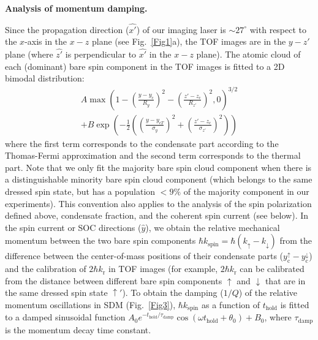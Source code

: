 \documentclass[showpacs,preprintnumbers,amsmath,amssymb, superscriptaddress, aps, reprint]{revtex4-1}
\def\k_r{k_{\text{r}}}
\def\thold{t_{\text{hold}}}
\begin{document}
{{{\vspace{5mm}

\textbf{Analysis of momentum damping.} 

Since the propagation direction ($\hat{x'}$) of our imaging laser is $\sim 27^{\circ}$ with respect to the $x$-axis in the $x-z$ plane (see Fig.~\ref{Fig1}a), the TOF images are in the $y-z'$ plane (where $\hat{z'}$ is perpendicular to $\hat{x'}$ in the $x-z$ plane). The atomic cloud of each (dominant) bare spin component in the TOF images is fitted to a 2D bimodal distribution: 
\begin{equation}
\begin{split}
A\max {\left( {1 - {{\left( {\frac{{y - {y_{\text{c}}}}}{{{R_y}}}} \right)}^2} - {{\left( {\frac{z'-{z_{\text{c}}}}{R_{z'}}} \right)}^2},0} \right)^{3/2}}\\
+ B\exp \left( { - \frac{1}{2}\left( {{{\left( {\frac{{y - {y_{cT}}}}{{{\sigma _y}}}} \right)}^2} + {{\left( {\frac{{z' - {z_{\text{c}}}}}{{{\sigma_{z'}}}}} \right)}^2}} \right)} \right)
\label{2D_TFG_Function}
\end{split}
\end{equation}
where the first term corresponds to the condensate part according to the Thomas-Fermi approximation and the second term corresponds to the thermal part. Note that we only fit the majority bare spin cloud component when there is a distinguishable minority bare spin cloud component (which belongs to the same dressed spin state, but has a population $<9\%$ of the majority component in our experiments). This convention also applies to the analysis of the spin polarization defined above, condensate fraction, and the coherent spin current (see below). In the spin current or SOC directions ($\hat{y}$), we obtain the relative mechanical momentum between the two bare spin components $\hbar {k_{\text{spin}}}=\hbar ({k_ \uparrow } - {k_ \downarrow })$ from the difference between the center-of-mass positions of their condensate parts ($y_{\text{c}}^\uparrow-y_{\text{c}}^\downarrow$) and the calibration of $2\hbar \k_r$ in TOF images (for example, $2\hbar \k_r$ can be calibrated from the distance between different bare spin components $\uparrow$ and $\downarrow$ that are in the same dressed spin state $\uparrow'$). To obtain the damping ($1/Q$) of the relative momentum oscillations in SDM (Fig.~\ref{Fig3}), $\hbar {k_{\text{spin}}}$ as a function of $\thold$ is fitted to a damped sinusoidal function ${A_0}e^{-\thold/\tau_{\text{damp}}}\cos (\omega {\thold} + {\theta _0}) + {B_0}$, where ${\tau_{\text{damp}}}$ is the momentum decay time constant. 
}}}
\end{document}
